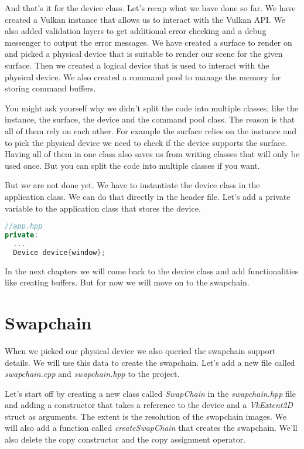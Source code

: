 \documentclass[12pt]{report} \usepackage{preamble}
\begin{document}
And that's it for the device class. Let's recap what we have done so far. We have created a Vulkan instance
that allows us to interact with the Vulkan \ac{API}. We also added validation layers to get additional error checking
and a debug messenger to output the error messages. We have created a surface to render on and picked a physical
device that is suitable to render our scene for the given surface. Then we created a logical device that is used
to interact with the physical device. We also created a command pool to manage the memory for storing command buffers.

You might ask yourself why we didn't split the code into multiple classes, like the instance, the surface, the device and
the command pool class. The reason is that all of them rely on each other. For example the surface relies on the instance
and to pick the physical device we need to check if the device supports the surface. Having all of them in one class
also saves us from writing classes that will only be used once. But you can split the code into multiple classes if you want.

But we are not done yet. We have to instantiate the device class in the application class. We can do that directly in the
header file. Let's add a private variable to the application class that stores the device.

\begin{lstlisting}[language=C++]
//app.hpp
private:
  ...
  Device device{window};
\end{lstlisting}

In the next chapters we will come back to the device class and add functionalities like creating buffers. But for now
we will move on to the swapchain.

\section{Swapchain}

When we picked our physical device we also queried the swapchain support details. We will use this data to create
the swapchain. Let's add a new file called \textit{swapchain.cpp} and \textit{swapchain.hpp} to the project.

Let's start off by creating a new class called \textit{SwapChain} in the \textit{swapchain.hpp} file and adding a
constructor that takes a reference to the device and a \textit{VkExtent2D} struct as arguments. The extent is the
resolution of the swapchain images. We will also add a function called \textit{createSwapChain} that creates the swapchain.
We'll also delete the copy constructor and the copy assignment operator.
\end{document}
